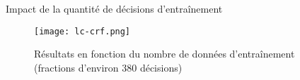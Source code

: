 %
%
%

\begin{frame}{Impact de la quantité de décisions d'entraînement}
\begin{figure}[!h]
\texttt{[image: lc-crf.png]}
\caption{Résultats en fonction du nombre de données d'entraînement (fractions d'environ 380 décisions)}\label{p4_crf-learning-curves}
\end{figure}
\end{frame}

